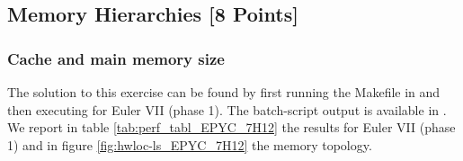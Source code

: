 \documentclass[unicode,10pt,a4paper,oneside,numbers=endperiod,openany]{scrartcl}
\begin{document}
\subsection{Memory Hierarchies [8 Points]}



\subsubsection{Cache and main memory size}
The solution to this exercise can be found by first running the Makefile
in 
and then executing 
for Euler VII (phase 1).
The batch-script output is available in
.\\
We report in table \ref{tab:perf_tabl_EPYC_7H12} the results for Euler VII (phase 1) and in figure \ref{fig:hwloc-ls_EPYC_7H12} the memory topology.\\
\end{document}
